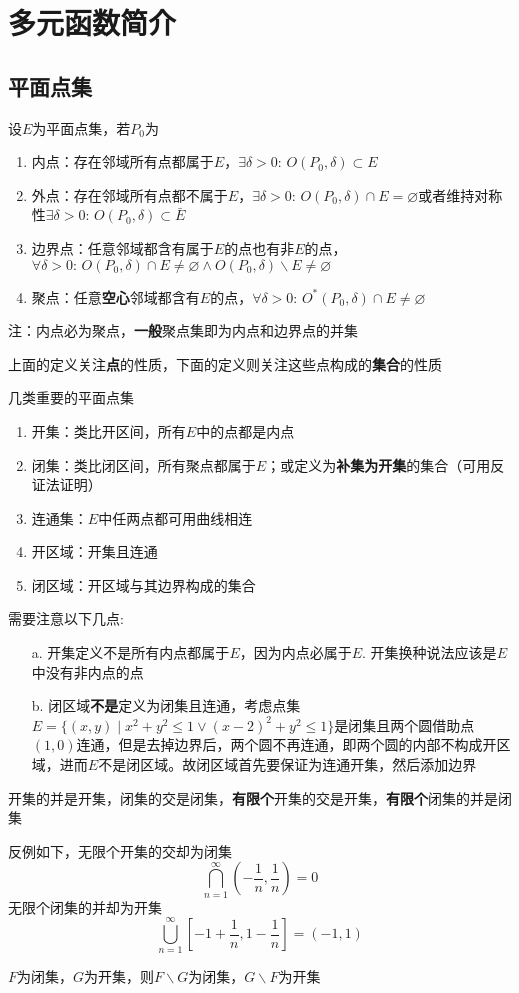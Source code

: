
\section{多元函数简介}
\subsection{平面点集}
\begin{definition}
设$E$为平面点集，若$P_0$为
\begin{enumerate}
	\item 内点：存在邻域所有点都属于$E$，$\exists\delta>0:\,O(P_0,\delta)\subset E$
	\item 外点：存在邻域所有点都不属于$E$，$\exists\delta>0:\,O(P_0,\delta)\cap E=\varnothing$或者维持对称性$\exists\delta>0:\,O(P_0,\delta)\subset\bar{E}$
	\item 边界点：任意邻域都含有属于$E$的点也有非$E$的点，$\forall\delta>0:\,O(P_0,\delta)\cap E\ne\varnothing \land O(P_0,\delta)\backslash E\ne\varnothing$
	\item 聚点：任意\textbf{空心}邻域都含有$E$的点，$\forall\delta>0:\,O^*(P_0,\delta)\cap E\ne\varnothing$
\end{enumerate}
注：内点必为聚点，\textbf{一般}聚点集即为内点和边界点的并集
\end{definition}
上面的定义关注\textbf{点}的性质，下面的定义则关注这些点构成的\textbf{集合}的性质
\begin{definition}
几类重要的平面点集
\begin{enumerate}
	\item 开集：类比开区间，所有$E$中的点都是内点
	\item 闭集：类比闭区间，所有聚点都属于$E$；或定义为\textbf{补集为开集}的集合（可用反证法证明）
	\item 连通集：$E$中任两点都可用曲线相连
	\item 开区域：开集且连通
	\item 闭区域：开区域与其边界构成的集合
\end{enumerate}
需要注意以下几点:
\begin{enumerate}
	\item[a.] 开集定义不是所有内点都属于$E$，因为内点必属于$E$. 开集换种说法应该是$E$中没有非内点的点
	\item[b.] 闭区域\textbf{不是}定义为闭集且连通，考虑点集$E=\{(x,y)\mid x^2+y^2\leq 1\lor (x-2)^2+y^2\leq 1\}$是闭集且两个圆借助点$(1,0)$连通，但是去掉边界后，两个圆不再连通，即两个圆的内部不构成开区域，进而$E$不是闭区域。故闭区域首先要保证为连通开集，然后添加边界
\end{enumerate}
\end{definition}
\begin{theorem}
开集的并是开集，闭集的交是闭集，\textbf{有限个}开集的交是开集，\textbf{有限个}闭集的并是闭集
\end{theorem}
反例如下，无限个开集的交却为闭集
\[\bigcap_{n=1}^\infty(-\frac{1}{n},\frac{1}{n})=0\]
无限个闭集的并却为开集
\[\bigcup_{n=1}^\infty[-1+\frac{1}{n},1-\frac{1}{n}]=(-1,1)\]
\begin{corollary2}
$F$为闭集，$G$为开集，则$F\backslash G$为闭集，$G\backslash F$为开集
\end{corollary2}

